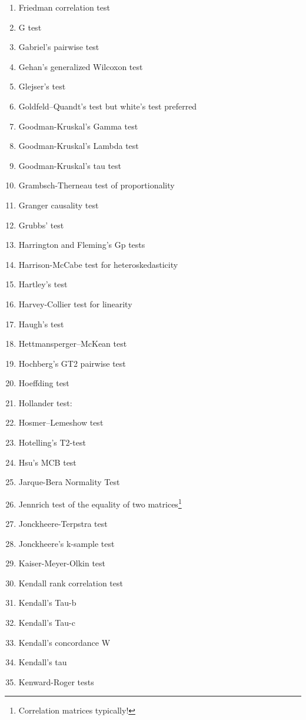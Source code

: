 \begin{itemize}
\begin{multicols}{3}
\begin{enumerate}
			\item Friedman correlation test
			\item G test
			\item Gabriel's pairwise test
			\item Gehan's generalized Wilcoxon test
			\item Glejser's test
			\item Goldfeld–Quandt's test but white's test preferred
			\item Goodman-Kruskal's Gamma test
			\item Goodman-Kruskal's Lambda test
			\item Goodman-Kruskal's tau test
			\item Grambsch-Therneau test of proportionality
			\item Granger causality test
			\item Grubbs' test
			\item Harrington and Fleming's Gp tests
			\item Harrison-McCabe test for heteroskedasticity
			\item Hartley's test
			\item Harvey-Collier test for linearity
			\item Haugh's test
			\item Hettmansperger–McKean test
			\item Hochberg's GT2 pairwise test
			\item Hoeffding test
			\item Hollander test:
			\item Hosmer–Lemeshow test
			\item Hotelling's T2-test 
			\item Hsu's MCB test
			\item Jarque-Bera Normality Test
			\item Jennrich test of the equality of two matrices\footnote{Correlation matrices typically!}
			\item Jonckheere-Terpstra test
			\item Jonckheere's k-sample test
			\item Kaiser-Meyer-Olkin test
			\item Kendall rank correlation test
			\item Kendall's Tau-b
			\item Kendall's Tau-c
			\item Kendall's concordance W
			\item Kendall's tau
			\item Kenward-Roger tests

\end{enumerate}
\end{multicols}
\end{itemize}
